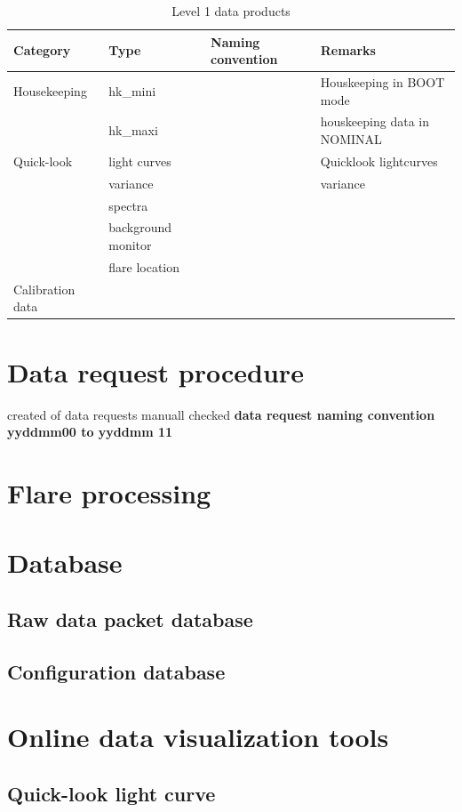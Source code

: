 \documentclass{aa}
\begin{document}
\begin{table}
\centering
\caption{Level 1 data products}
\begin{tabular}{llll}
Category & Type   &  Naming convention  & Remarks   \\ \hline
 Housekeeping & hk\_mini  &  & Houskeeping in BOOT mode   \\
 & hk\_maxi  &  & houskeeping data in NOMINAL   \\
 Quick-look &  light curves &  & Quicklook lightcurves \\
  &  variance &  & variance \\
  &  spectra &  &  \\
  &  background monitor &  &  \\
    &  flare location &  &  \\
 Calibration data &   &  &  \\
\end{tabular}
\end{table}

\section{Data request procedure}
created of data requests
manuall checked
\textbf{  data request naming convention  yyddmm00  to yyddmm 11 }


\section{Flare processing}

\section{Database}
\subsection{Raw data packet database } 
\subsection{Configuration database}

\section{Online data visualization tools}
\subsection{Quick-look light curve}
\end{document}
